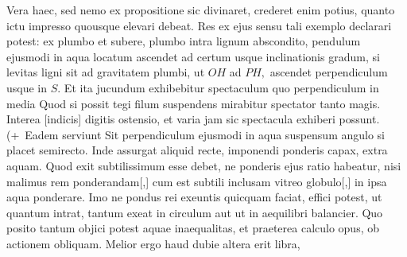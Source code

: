 Vera haec, sed nemo ex propositione sic divinaret,
crederet enim potius, quanto ictu impresso quousque elevari debeat.
Res ex ejus sensu tali exemplo declarari potest:
ex plumbo\protect{}
et subere\protect{},
plumbo intra lignum\protect{} abscondito,
pendulum\protect{} ejusmodi
in aqua\protect{} locatum
ascendet ad certum usque inclinationis gradum,
si levitas\protect{} ligni sit
ad gravitatem\protect{} plumbi, ut $\displaystyle OH$ ad $\displaystyle PH,$
ascendet perpendiculum\protect{} usque in $\displaystyle S.$
Et ita jucundum exhibebitur spectaculum\protect{}
quo perpendiculum in media
Quod si possit tegi filum\protect{} suspendens
mirabitur spectator tanto magis.
Interea [indicis]
digitis ostensio, et varia jam sic spectacula\protect{} exhiberi possunt.
(+~Eadem serviunt
Sit perpendiculum\protect{} ejusmodi
in aqua suspensum angulo si placet semirecto.
Inde assurgat aliquid recte, imponendi ponderis capax, extra aquam\protect{}.
Quod exit subtilissimum esse debet,
ne ponderis ejus ratio habeatur,
nisi malimus rem ponderandam[,]
cum est subtili inclusam vitreo globulo[,]\protect{}
in ipsa aqua ponderare.
Imo ne pondus\protect{} rei exeuntis quicquam faciat,
effici potest, ut quantum intrat, tantum exeat in circulum
aut ut in aequilibri balancier\protect{}.
Quo posito tantum objici potest aquae inaequalitas,
et praeterea calculo opus, ob actionem obliquam.
Melior ergo haud dubie altera erit libra,\protect{}
